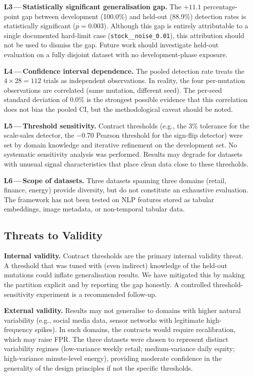 \documentclass[journal]{IEEEtran}
\newcommand{\mut}[1]{\mbox{\texttt{#1}}}
\begin{document}
\textbf{L3\,---\,Statistically significant generalisation gap.}  The
$+11.1$ percentage-point gap between development (100.0\%) and held-out
(88.9\%) detection rates is statistically significant ($p = 0.003$).
Although this gap is entirely attributable to a single documented hard-limit
case (\mut{stock\_\_noise\_0.01}), this attribution should not be used to
dismiss the gap.  Future work should investigate held-out evaluation on a
fully disjoint dataset with no development-phase exposure.

\textbf{L4\,---\,Confidence interval dependence.}  The pooled detection
rate treats the $4 \times 28 = 112$ trials as independent observations.  In
reality, the four per-mutation observations are correlated (same mutation,
different seed).  The per-seed standard deviation of 0.0\% is the strongest
possible evidence that this correlation does not bias the pooled CI, but the
methodological caveat should be noted.

\textbf{L5\,---\,Threshold sensitivity.}  Contract thresholds (e.g., the
3\% tolerance for the scale-sales detector, the $-0.70$ Pearson threshold
for the sign-flip detector) were set by domain knowledge and iterative
refinement on the development set.  No systematic sensitivity analysis was
performed.  Results may degrade for datasets with unusual signal
characteristics that place clean data close to these thresholds.

\textbf{L6\,---\,Scope of datasets.}  Three datasets spanning three domains
(retail, finance, energy) provide diversity, but do not constitute an
exhaustive evaluation.  The framework has not been tested on NLP features
stored as tabular embeddings, image metadata, or non-temporal tabular data.

\subsection{Threats to Validity}

\textbf{Internal validity.}  Contract thresholds are the primary internal
validity threat.  A threshold that was tuned with (even indirect) knowledge
of the held-out mutations could inflate generalisation results.  We have
mitigated this by making the partition explicit and by reporting the gap
honestly.  A controlled threshold-sensitivity experiment is a recommended
follow-up.

\textbf{External validity.}  Results may not generalise to domains with
higher natural variability (e.g., social media data, sensor networks with
legitimate high-frequency spikes).  In such domains, the contracts would
require recalibration, which may raise FPR.  The three datasets were chosen
to represent distinct variability regimes (low-variance weekly retail;
medium-variance daily equity; high-variance minute-level energy), providing
moderate confidence in the generality of the design principles if not
the specific thresholds.
\end{document}
